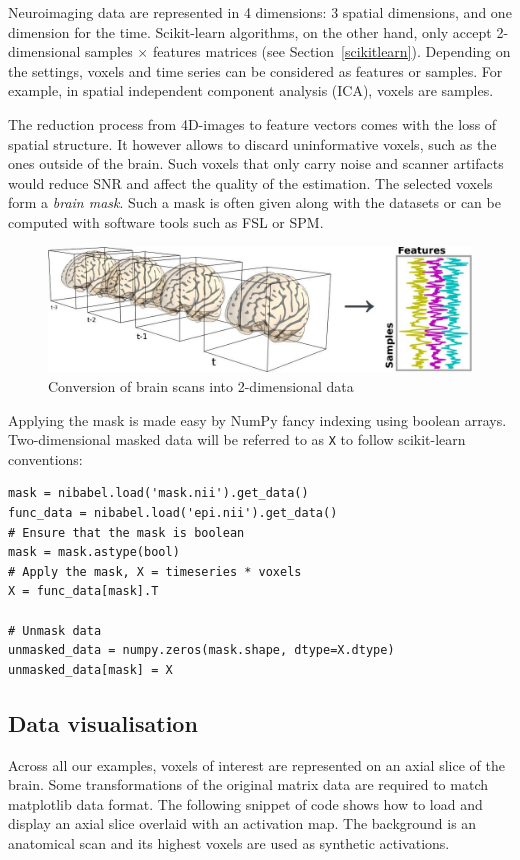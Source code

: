 \documentclass{frontiersSCNS} %
\begin{document}
Neuroimaging data are represented in 4 dimensions: 3 spatial dimensions, and 
one dimension for the time.
Scikit-learn algorithms, on the other hand, only accept 2-dimensional
samples $\times$ features matrices (see Section~\ref{scikitlearn}).
Depending on the settings, voxels and time series can be
considered as features
or samples. For example, in spatial independent component analysis (ICA),
voxels are samples.


The reduction process from 4D-images to feature vectors comes with the loss
of spatial structure. It however allows to discard uninformative
voxels, such as the ones outside of the brain. Such voxels that
only carry noise and scanner artifacts would reduce SNR and affect the
quality of the estimation. The selected voxels form a \emph{brain mask}.
Such a mask is often given along with the datasets or can be computed
with software tools such as FSL or SPM.

\begin{figure}[hbtp]
    \begin{center}
        \includegraphics[width=.5\linewidth]{niimgs.jpg}
    \end{center}
    \caption{Conversion of brain scans into 2-dimensional data}
    \label{fig:niimg}
\end{figure}

Applying the mask is made easy by NumPy fancy indexing using boolean arrays.
Two-dimensional masked data will be referred to as \texttt{X} to follow
scikit-learn conventions:
\begin{lstlisting}
mask = nibabel.load('mask.nii').get_data()
func_data = nibabel.load('epi.nii').get_data()
# Ensure that the mask is boolean
mask = mask.astype(bool)
# Apply the mask, X = timeseries * voxels
X = func_data[mask].T

# Unmask data
unmasked_data = numpy.zeros(mask.shape, dtype=X.dtype)
unmasked_data[mask] = X
\end{lstlisting}

\subsection{Data visualisation}

Across all our examples, voxels of interest are represented on an axial slice of
the brain. Some transformations of the original matrix data are required to match
matplotlib data format. The following snippet of code shows how to load and
display an axial slice overlaid with an activation map. The background is an
anatomical scan and its highest voxels are used as synthetic
activations.
\end{document}
